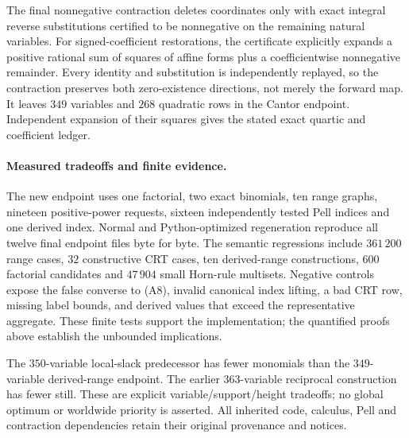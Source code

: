 The final nonnegative contraction deletes coordinates only with exact
integral reverse substitutions certified to be nonnegative on the
remaining natural variables.  For signed-coefficient restorations,
the certificate explicitly expands a positive rational sum of squares
of affine forms plus a coefficientwise nonnegative remainder.
Every identity and substitution is independently replayed, so the
contraction preserves both zero-existence directions, not merely the
forward map.  It leaves \(349\) variables and \(268\) quadratic rows
in the Cantor endpoint.  Independent expansion of their squares gives
the stated exact quartic and coefficient ledger.

\paragraph{Measured tradeoffs and finite evidence.}
The new endpoint uses one factorial, two exact binomials, ten range
graphs, nineteen positive-power requests, sixteen independently tested
Pell indices and one derived index.  Normal and Python-optimized
regeneration reproduce all twelve final endpoint files byte for byte.
The semantic regressions include \(361\,200\) range cases, \(32\)
constructive CRT cases, ten derived-range constructions, \(600\)
factorial candidates and \(47\,904\) small Horn-rule multisets.
Negative controls expose the false converse to (A8), invalid canonical
index lifting, a bad CRT row, missing label bounds, and derived values
that exceed the representative aggregate.  These finite tests support
the implementation; the quantified proofs above establish the
unbounded implications.

The \(350\)-variable local-slack predecessor has fewer monomials than
the \(349\)-variable derived-range endpoint.  The earlier \(363\)-variable
reciprocal construction has fewer still.  These are explicit
variable/support/height tradeoffs; no global optimum or worldwide
priority is asserted.  All inherited code, calculus, Pell and
contraction dependencies retain their original provenance and notices.
